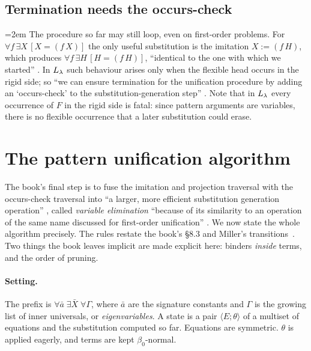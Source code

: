 \subsection{Termination needs the occurs-check}

{\emergencystretch=2em
The procedure so far may still loop, even on first-order problems. For $\forall f\,\exists X\,[X=(f\,X)]$ the only
useful substitution is the imitation $X:=(f\,H)$, which produces $\forall f\,\exists H\,[H=(f\,H)]$, \enquote{identical
to the one with which we started} . In $L_\lambda$ such behaviour arises only when the flexible head
occurs in the rigid side; so \enquote{we can ensure termination for the unification procedure by adding an
\enquote{occurs-check} to the substitution-generation step} . Note that in $L_\lambda$ every occurrence of $F$ in
the rigid side is fatal: since pattern arguments are variables, there is no flexible occurrence that a later
substitution could erase.\par}

\section{The pattern unification algorithm}\label{sec:hounif-algo}

The book's final step is to fuse the imitation and projection traversal with the occurs-check traversal into
\enquote{a larger, more efficient substitution generation operation} , called \emph{variable elimination}
\enquote{because of its similarity to an operation of the same name discussed for first-order unification}
. We now state the whole algorithm precisely. The rules restate the book's \S8.3 and Miller's
transitions~\cite[\S6, p.~14--16]{Miller1991}. Two things the book leaves implicit are made explicit here: binders
\emph{inside} terms, and the order of pruning.

\paragraph{Setting.} The prefix is $\forall\bar a\;\exists\bar X\;\forall\Gamma$, where $\bar a$ are the signature
constants and $\Gamma$ is the growing list of inner universals, or \emph{eigenvariables}. A state is a pair
$\langle E;\theta\rangle$ of a multiset of equations and the substitution computed so far. Equations are symmetric.
$\theta$ is applied eagerly, and terms are kept $\beta_0$-normal.

